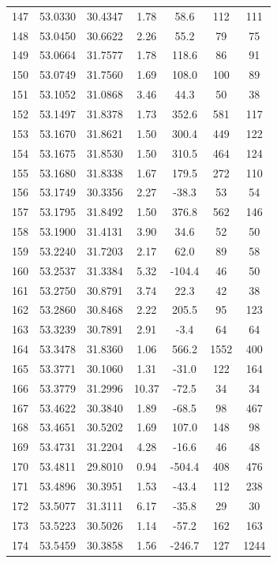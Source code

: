 \begin{longtable}{ccccccc}
147 & 53.0330 & 30.4347 & 1.78 & 58.6 & 112 & 111 \\
148 & 53.0450 & 30.6622 & 2.26 & 55.2 & 79 & 75 \\
149 & 53.0664 & 31.7577 & 1.78 & 118.6 & 86 & 91 \\
150 & 53.0749 & 31.7560 & 1.69 & 108.0 & 100 & 89 \\
151 & 53.1052 & 31.0868 & 3.46 & 44.3 & 50 & 38 \\
152 & 53.1497 & 31.8378 & 1.73 & 352.6 & 581 & 117 \\
153 & 53.1670 & 31.8621 & 1.50 & 300.4 & 449 & 122 \\
154 & 53.1675 & 31.8530 & 1.50 & 310.5 & 464 & 124 \\
155 & 53.1680 & 31.8338 & 1.67 & 179.5 & 272 & 110 \\
156 & 53.1749 & 30.3356 & 2.27 & -38.3 & 53 & 54 \\
157 & 53.1795 & 31.8492 & 1.50 & 376.8 & 562 & 146 \\
158 & 53.1900 & 31.4131 & 3.90 & 34.6 & 52 & 50 \\
159 & 53.2240 & 31.7203 & 2.17 & 62.0 & 89 & 58 \\
160 & 53.2537 & 31.3384 & 5.32 & -104.4 & 46 & 50 \\
161 & 53.2750 & 30.8791 & 3.74 & 22.3 & 42 & 38 \\
162 & 53.2860 & 30.8468 & 2.22 & 205.5 & 95 & 123 \\
163 & 53.3239 & 30.7891 & 2.91 & -3.4 & 64 & 64 \\
164 & 53.3478 & 31.8360 & 1.06 & 566.2 & 1552 & 400 \\
165 & 53.3771 & 30.1060 & 1.31 & -31.0 & 122 & 164 \\
166 & 53.3779 & 31.2996 & 10.37 & -72.5 & 34 & 34 \\
167 & 53.4622 & 30.3840 & 1.89 & -68.5 & 98 & 467 \\
168 & 53.4651 & 30.5202 & 1.69 & 107.0 & 148 & 98 \\
169 & 53.4731 & 31.2204 & 4.28 & -16.6 & 46 & 48 \\
170 & 53.4811 & 29.8010 & 0.94 & -504.4 & 408 & 476 \\
171 & 53.4896 & 30.3951 & 1.53 & -43.4 & 112 & 238 \\
172 & 53.5077 & 31.3111 & 6.17 & -35.8 & 29 & 30 \\
173 & 53.5223 & 30.5026 & 1.14 & -57.2 & 162 & 163 \\
174 & 53.5459 & 30.3858 & 1.56 & -246.7 & 127 & 1244 \\

\end{longtable}
